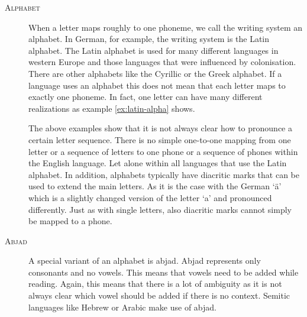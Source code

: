 \begin{description}
\item[\textsc{Alphabet}] When a letter maps roughly to one phoneme, we call the writing system an alphabet. In German, for example, the writing system is the Latin alphabet. The Latin alphabet is used for many different languages in western Europe and those languages that were influenced by colonisation. There are other alphabets like the Cyrillic or the Greek alphabet. If a language uses an alphabet this does not mean that each letter maps to exactly one phoneme. In fact, one letter can have many different realizations as example \ref{ex:latin-alpha} shows.

The above examples show that it is not always clear how to pronounce a certain letter sequence. There is no simple one-to-one mapping from one letter or a sequence of letters to one phone or a sequence of phones within the English language. Let alone within all languages that use the Latin alphabet. In addition, alphabets typically have diacritic marks that can be used to extend the main letters. As it is the case with the German `ä' which is a slightly changed version of the letter `a' and pronounced differently. Just as with single letters, also diacritic marks cannot simply be mapped to a phone.

\item[\textsc{Abjad}] A special variant of an alphabet is abjad. Abjad represents only consonants and no vowels. This means that vowels need to be added while reading. Again, this means that there is a lot of ambiguity as it is not always clear which vowel should be added if there is no context. Semitic languages like Hebrew or Arabic make use of abjad.


\end{description}
